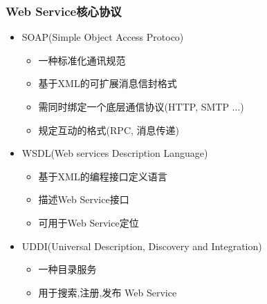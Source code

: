 \documentclass[CJKutf8,compress,hyperref]{beamer}
\begin{document}
\begin{CJK}{UTF8}{song}
        \begin{frame}
                \frametitle{ Web Service核心协议}
                \begin{itemize}
                        \item SOAP(Simple Object Access Protoco)\cite{SOAPTerminology}
                                \begin{itemize}
                                        \item 一种标准化通讯规范
                                        \item 基于XML的可扩展消息信封格式
                                        \item 需同时绑定一个底层通信协议(HTTP, SMTP ...)
                                        \item 规定互动的格式(RPC, 消息传递)
                                \end{itemize}
                        \item WSDL(Web services Description Language)\cite{WSDLTerminology}
                                \begin{itemize}
                                        \item 基于XML的编程接口定义语言
                                        \item 描述Web Service接口
                                        \item 可用于Web Service定位
                                \end{itemize}
                        \item UDDI(Universal Description, Discovery and Integration)\cite{UDDITerminology}
                                \begin{itemize}
                                        \item 一种目录服务
                                        \item 用于搜索,注册,发布 Web Service
                                \end{itemize}
                \end{itemize}
        \end{frame}


\end{CJK}
\end{document}
